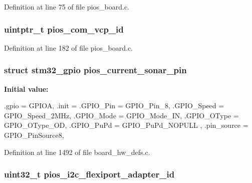 \-Definition at line 75 of file pios\-\_\-board.\-c.

\hypertarget{group___revo_mini_gaaeb3e0d65ed5c6e7b921c54e1ad905db}{
\subsubsection[{pios\-\_\-com\-\_\-vcp\-\_\-id}]{\setlength{\rightskip}{0pt plus 5cm}uintptr\-\_\-t {\bf pios\-\_\-com\-\_\-vcp\-\_\-id}}}\label{group___revo_mini_gaaeb3e0d65ed5c6e7b921c54e1ad905db}


\-Definition at line 182 of file pios\-\_\-board.\-c.

\hypertarget{group___revo_mini_ga606e58ec5cbb14b404f825ca313fb71e}{
\subsubsection[{pios\-\_\-current\-\_\-sonar\-\_\-pin}]{\setlength{\rightskip}{0pt plus 5cm}struct {\bf stm32\-\_\-gpio} {\bf pios\-\_\-current\-\_\-sonar\-\_\-pin}}}\label{group___revo_mini_ga606e58ec5cbb14b404f825ca313fb71e}
{\bfseries \-Initial value\-:}
\begin{DoxyCode}
{
    .gpio = GPIOA,
                        .init = {
                                .GPIO_Pin = GPIO_Pin_8,
                                .GPIO_Speed = GPIO_Speed_2MHz,
                                .GPIO_Mode  = GPIO_Mode_IN,
                                .GPIO_OType = GPIO_OType_OD,
                                .GPIO_PuPd  = GPIO_PuPd_NOPULL
                        },
                        .pin_source = GPIO_PinSource8,
}
\end{DoxyCode}


\-Definition at line 1492 of file board\-\_\-hw\-\_\-defs.\-c.

\hypertarget{group___revo_mini_ga20b68de0b754d943d653d816aad86148}{
\subsubsection[{pios\-\_\-i2c\-\_\-flexiport\-\_\-adapter\-\_\-id}]{\setlength{\rightskip}{0pt plus 5cm}uint32\-\_\-t {\bf pios\-\_\-i2c\-\_\-flexiport\-\_\-adapter\-\_\-id}}}\label{group___revo_mini_ga20b68de0b754d943d653d816aad86148}


